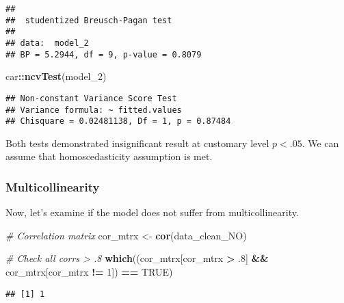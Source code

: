 \documentclass[]{article}
\newenvironment{Shaded}{\begin{snugshade}}{\end{snugshade}}
\newcommand{\CommentTok}[1]{\textcolor[rgb]{0.56,0.35,0.01}{\textit{#1}}}
\newcommand{\DecValTok}[1]{\textcolor[rgb]{0.00,0.00,0.81}{#1}}
\newcommand{\FloatTok}[1]{\textcolor[rgb]{0.00,0.00,0.81}{#1}}
\newcommand{\KeywordTok}[1]{\textcolor[rgb]{0.13,0.29,0.53}{\textbf{#1}}}
\newcommand{\NormalTok}[1]{#1}
\newcommand{\OperatorTok}[1]{\textcolor[rgb]{0.81,0.36,0.00}{\textbf{#1}}}
\newcommand{\OtherTok}[1]{\textcolor[rgb]{0.56,0.35,0.01}{#1}}
\newcommand{\StringTok}[1]{\textcolor[rgb]{0.31,0.60,0.02}{#1}}
\begin{document}
\begin{verbatim}
## 
##  studentized Breusch-Pagan test
## 
## data:  model_2
## BP = 5.2944, df = 9, p-value = 0.8079
\end{verbatim}

\begin{Shaded}
\begin{Highlighting}[]
\NormalTok{car}\OperatorTok{::}\KeywordTok{ncvTest}\NormalTok{(model_}\DecValTok{2}\NormalTok{)}
\end{Highlighting}
\end{Shaded}

\begin{verbatim}
## Non-constant Variance Score Test 
## Variance formula: ~ fitted.values 
## Chisquare = 0.02481138, Df = 1, p = 0.87484
\end{verbatim}

Both tests demonstrated insignificant result at customary level
\(p < .05\). We can assume that homoscedasticity assumption is met.

\hypertarget{multicollinearity}{%
\subsubsection{Multicollinearity}\label{multicollinearity}}

Now, let's examine if the model does not suffer from multicollinearity.

\begin{Shaded}
\begin{Highlighting}[]
\CommentTok{# Correlation matrix}
\NormalTok{cor_mtrx <-}\StringTok{ }\KeywordTok{cor}\NormalTok{(data_clean_NO)}
\end{Highlighting}
\end{Shaded}

\begin{Shaded}
\begin{Highlighting}[]
\CommentTok{# Check all corrs > .8}
\KeywordTok{which}\NormalTok{((cor_mtrx[cor_mtrx }\OperatorTok{>}\StringTok{ }\FloatTok{.8}\NormalTok{] }\OperatorTok{&&}\StringTok{ }\NormalTok{cor_mtrx[cor_mtrx }\OperatorTok{!=}\StringTok{ }\DecValTok{1}\NormalTok{]) }\OperatorTok{==}\StringTok{ }\OtherTok{TRUE}\NormalTok{)}
\end{Highlighting}
\end{Shaded}

\begin{verbatim}
## [1] 1
\end{verbatim}
\end{document}
